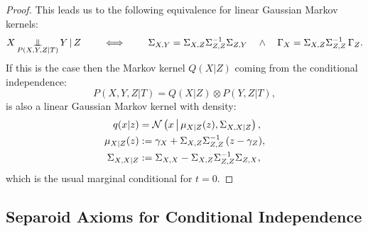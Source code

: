 \begin{proof}

This leads us to the following equivalence for linear Gaussian Markov kernels:
\[X \operatorname*{\perp\mkern-11mu\perp}_{P(X,Y,Z|T)} Y \operatorname*{|} Z \qquad \iff \qquad \Sigma_{X,Y} = \Sigma_{X,Z} \Sigma_{Z,Z}^{-1}\Sigma_{Z,Y} 
\quad \land \quad \Gamma_X = \Sigma_{X,Z}\Sigma_{Z,Z}^{-1}\,\Gamma_Z. \]
If this is the case then the Markov kernel $Q(X|Z)$ coming from the conditional independence:
\[P(X,Y,Z|T) = Q(X|Z) \otimes P(Y,Z|T),\]
is also a linear Gaussian Markov kernel
with density:
\begin{align*}
    q(x|z) &= \mathcal{N}\left ( x \,\middle|\, \mu_{X|Z}(z), \Sigma_{X,X|Z} \right ),\\ 
    \mu_{X|Z}(z)   &:= \gamma_X + \Sigma_{X,Z}\Sigma_{Z,Z}^{-1}\, (z-\gamma_Z),\\
    \Sigma_{X,X|Z} & := \Sigma_{X,X} - \Sigma_{X,Z}\Sigma_{Z,Z}^{-1} \Sigma_{Z,X},
\end{align*}
which is the usual marginal conditional for $t=0$.
\end{proof}



\subsection{Separoid Axioms for Conditional Independence}


